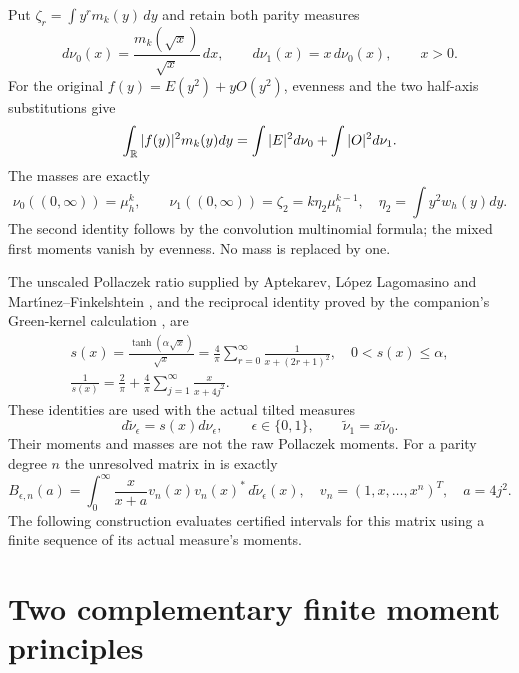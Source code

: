 Put $\zeta_r=\int y^rm_k(y)\,dy$ and retain both parity measures
\begin{equation}\label{mmnative:eq:parities}
 d\nu_0(x)=\frac{m_k(\sqrt x)}{\sqrt x}\,dx,\qquad
 d\nu_1(x)=x\,d\nu_0(x),\qquad x>0.
\end{equation}
For the original $f(y)=E(y^2)+yO(y^2)$, evenness and the two
half-axis substitutions give
\begin{equation}\label{mmnative:eq:paritynorm}
 \int_\mathbb R|f(y)|^2m_k(y)dy
 =\int|E|^2d\nu_0+\int|O|^2d\nu_1.
\end{equation}
The masses are exactly
\[
 \nu_0((0,\infty))=\mu_h^k,\qquad
 \nu_1((0,\infty))=\zeta_2=k\eta_2\mu_h^{k-1},
 \quad\eta_2=\int y^2w_h(y)dy.
\]
The second identity follows by the convolution multinomial formula;
the mixed first moments vanish by evenness.  No mass is replaced by one.

The unscaled Pollaczek ratio supplied by Aptekarev, L\'opez Lagomasino
and Mart\'{\i}nez--Finkelshtein \cite{mmnative:ALM}, and the reciprocal identity
proved by the companion's Green-kernel calculation \cite{mmnative:PP}, are
\begin{equation}\label{mmnative:eq:s}
 \begin{gathered}
 s(x)=\frac{\tanh(\alpha\sqrt x)}{\sqrt x}
 =\frac4\pi\sum_{r=0}^\infty\frac1{x+(2r+1)^2},
 \quad0<s(x)\le\alpha,\\
 \frac1{s(x)}=\frac2\pi+\frac4\pi
       \sum_{j=1}^\infty\frac{x}{x+4j^2}.
 \end{gathered}
\end{equation}
These identities are used with the actual tilted measures
\begin{equation}\label{mmnative:eq:tilts}
 d\widetilde\nu_\epsilon=s(x)d\nu_\epsilon,
 \qquad\epsilon\in\{0,1\},
 \qquad\widetilde\nu_1=x\widetilde\nu_0.
\end{equation}
Their moments and masses are not the raw Pollaczek moments.  For a
parity degree $n$ the unresolved matrix in \cite{mmnative:TR} is exactly
\begin{equation}\label{mmnative:eq:target}
 B_{\epsilon,n}(a)=\int_0^\infty
 \frac{x}{x+a}v_n(x)v_n(x)^*\,d\widetilde\nu_\epsilon(x),
 \quad v_n=(1,x,\ldots,x^n)^T,\quad a=4j^2.
\end{equation}
The following construction evaluates certified intervals for this
matrix using a finite sequence of its actual measure's moments.

\section{Two complementary finite moment principles}

